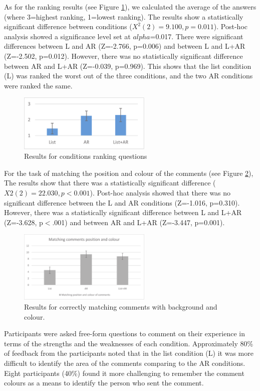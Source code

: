 As for the ranking results (see Figure \ref{fig:mgia16:ranking}), we calculated the average of the answers (where 3=highest ranking, 1=lowest ranking). The results show a statistically significant difference between conditions ($X^2(2)=9.100, p=0.011$). Post-hoc analysis showed a significance level set at $alpha$=0.017. There were significant differences between L and AR (Z=-2.766, p=0.006) and between L and L+AR (Z=-2.502, p=0.012). However, there was no statistically significant difference between AR and L+AR (Z=-0.039, p=0.969). This shows that the list condition (L) was ranked the worst out of the three conditions, and the two AR conditions were ranked the same.

\begin{figure}[ht]
  \centering
  \includegraphics[width=2.5in]{images/mgia16/ranking.eps}
  \caption{Results for conditions ranking questions}
	\label{fig:mgia16:ranking}
\end{figure}

For the task of matching the position and colour of the comments (see Figure \ref{fig:mgia16:questions_matching}), The results show that there was a statistically significant difference ($X2(2)=22.030, p<0.001$). Post-hoc analysis showed that there was no significant difference between the L and AR conditions (Z=-1.016, p=0.310). However, there was a statistically significant difference between L and L+AR (Z=-3.628, p$<$.001) and between AR and L+AR (Z=-3.447, p=0.001).

\begin{figure}[ht]
  \centering
  \includegraphics[width=2.5in]{images/mgia16/matching.eps}
  \caption{Results for correctly matching comments with background and colour.}
	\label{fig:mgia16:questions_matching}
\end{figure}

Participants were asked free-form questions to comment on their experience in terms of the strengths and the weaknesses of each condition. Approximately 80\% of feedback from the participants noted that in the list condition (L) it was more difficult to identify the area of the comments comparing to the AR conditions. Eight participants (40\%) found it more challenging to remember the comment colours as a means to identify the person who sent the comment. 

